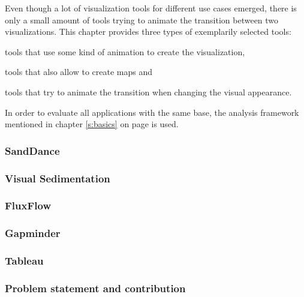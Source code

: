Even though a lot of visualization tools for different use cases emerged, there is only a small amount of tools trying to animate the transition between two visualizations. This chapter provides three types of exemplarily selected tools:

\begin{enumerate*}
\item tools that use some kind of animation to create the visualization,
\item tools that also allow to create maps and
\item tools that try to animate the transition when changing the visual appearance.
\end{enumerate*}

In order to evaluate all applications with the same base, the analysis framework mentioned in chapter \ref{s:basics} on page \pageref{s:basics} is used.

\subsubsection{SandDance}


\subsubsection{Visual Sedimentation}


\subsubsection{FluxFlow}


\subsubsection{Gapminder}


\subsubsection{Tableau}


\subsubsection{Problem statement and contribution}
